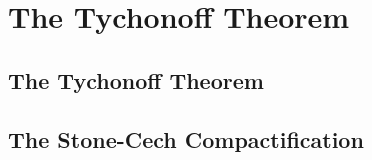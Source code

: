 \chapter{The Tychonoff Theorem}

\section{The Tychonoff Theorem}

\section{The Stone-Cech Compactification}
